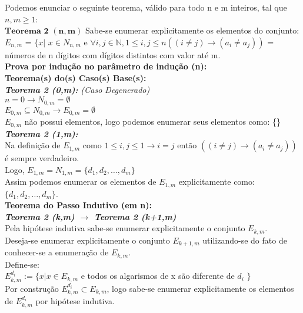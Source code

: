 \documentclass[twoside]{article}
\begin{document}
\begin{multicols}{2}
Podemos enunciar o seguinte teorema, válido para todo n e m inteiros, tal que $n,m\geq1$:\\

$\mathbf{Teorema}$ $\mathbf{2}$ $\mathbf{(n,m)}$ Sabe-se enumerar explicitamente os elementos do conjunto:\\
$E_{n,m}$ = $\{ x | $ $x \in N_{n,m}$ e $\forall i,j \in \mathbb{N}, 1 \leq i,j \leq n ((i \neq j) \rightarrow ( a_i \neq a_j ))$ = números de n dígitos com dígitos distintos com valor até m.\\

\textbf{Prova por indução no parâmetro de indução (n):}\\
\textbf{Teorema(s) do(s) Caso(s) Base(s):}\\

\textit{\textbf{Teorema 2 (0,m):} (Caso Degenerado)}\\
$n=0 \rightarrow N_{0,m} = \emptyset$\\
$E_{0,m} \subseteq N_{0,m} \rightarrow E_{0,m} = \emptyset $\\
$E_{0,m}$ não possui elementos, logo podemos enumerar seus elementos como: \{\}\\

\textit{\textbf{Teorema 2 (1,m):}}\\
Na definição de $E_{1,m}$ como $1 \leq i,j \leq 1 \rightarrow i=j$ então $((i \neq j) \rightarrow ( a_i \neq a_j ))$ é sempre verdadeiro.\\
Logo,  $E_{1,m} = N_{1,m} = \{d_1,d_2,\dots,d_m\}$\\
Assim podemos enumerar os elementos de  $E_{1,m}$ explicitamente como: $\{d_1,d_2,\dots,d_m\}$.\\

\textbf{Teorema do Passo Indutivo (em n):}\\
\textit{\textbf{Teorema 2 (k,m) $\rightarrow$ Teorema 2 (k+1,m)}}\\
Pela hipótese indutiva sabe-se enumerar explicitamente o conjunto $E_{k,m}$.\\
Deseja-se enumerar explicitamente o conjunto  $E_{k+1,m}$ utilizando-se do fato de conhecer-se a enumeração de  $E_{k,m}$.\\

Define-se:\\
$E_{k,m}^{d_i} := \{ x | x \in E_{k,m}$ e todos os algarismos de x são diferente de $d_i$ $\}$\\

Por construção $E_{k,m}^{d_i} \subset E_{k,m}$, logo sabe-se enumerar explicitamente os elementos de $E_{k,m}^{d_i}$ por hipótese indutiva.\\


\end{multicols}
\end{document}
